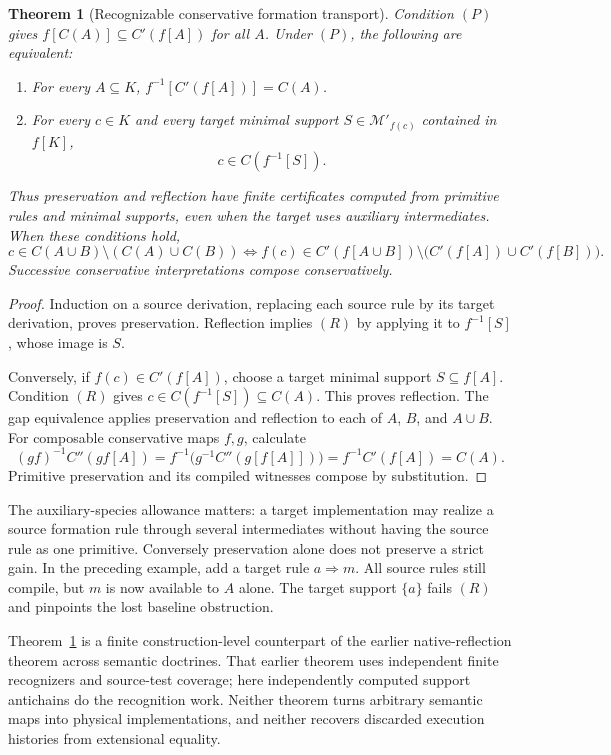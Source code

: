 \documentclass[11pt]{article}
\newtheorem{theorem}{Theorem}[section]
\theoremstyle{definition}
\theoremstyle{remark}
\begin{document}
\begin{theorem}[Recognizable conservative formation transport]
\label{syn-thm:transport}
Condition $(P)$ gives $f[C(A)]\subseteq C'(f[A])$ for all $A$.
Under $(P)$, the following are equivalent:
\begin{enumerate}
\item For every $A\subseteq K$,
$f^{-1}[C'(f[A])]=C(A)$.
\item For every $c\in K$ and every target minimal support
$S\in\mathcal M'_{f(c)}$ contained in $f[K]$,
\[
                 c\in C(f^{-1}[S]).
\tag{R}
\]
\end{enumerate}
Thus preservation and reflection have finite certificates computed from
primitive rules and minimal supports, even when the target uses auxiliary
intermediates. When these conditions hold,
\[
 c\in C(A\cup B)\setminus(C(A)\cup C(B))
 \Longleftrightarrow
 f(c)\in C'(f[A\cup B])
            \setminus\bigl(C'(f[A])\cup C'(f[B])\bigr).
\]
Successive conservative interpretations compose conservatively.
\end{theorem}
\begin{proof}
Induction on a source derivation, replacing each source rule by its target
derivation, proves preservation. Reflection implies $(R)$ by applying it
to $f^{-1}[S]$, whose image is $S$.

Conversely, if $f(c)\in C'(f[A])$, choose a target minimal support
$S\subseteq f[A]$. Condition $(R)$ gives
$c\in C(f^{-1}[S])\subseteq C(A)$. This proves reflection. The gap
equivalence applies preservation and reflection to each of $A$, $B$,
and $A\cup B$. For composable conservative maps $f,g$, calculate
\[
 (gf)^{-1}C''(gf[A])
       = f^{-1}\bigl(g^{-1}C''(g[f[A]])\bigr)
       = f^{-1}C'(f[A])=C(A).
\]
Primitive preservation and its compiled witnesses compose by substitution.
\end{proof}

The auxiliary-species allowance matters: a target implementation may
realize a source formation rule through several intermediates without
having the source rule as one primitive. Conversely preservation alone
does not preserve a strict gain. In the preceding example, add a target
rule $a\Rightarrow m$. All source rules still compile, but $m$ is now
available to $A$ alone. The target support $\{a\}$ fails $(R)$ and
pinpoints the lost baseline obstruction.

Theorem~\ref{syn-thm:transport} is a finite construction-level counterpart
of the earlier native-reflection theorem across semantic doctrines.
That earlier theorem uses independent finite recognizers and source-test
coverage; here independently computed support antichains do the
recognition work. Neither theorem turns arbitrary semantic maps into
physical implementations, and neither recovers discarded execution
histories from extensional equality.
\end{document}
